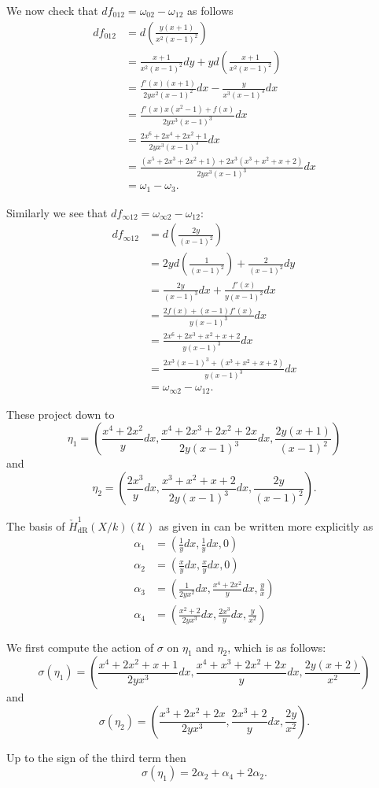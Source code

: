 \documentclass[draft, 11pt]{article} %
\theoremstyle{plain}
\theoremstyle{remark}
\newcommand{\cU}{{\mathcal U}}
\newcommand{\cechderhamhone}{\check{H}_{\text {dR}}^1(X/k)}
\begin{document}
We now check that $df_{0 1 2} = \omega_{0 2} - \omega_{1 2}$ as follows
\begin{align*}
df_{0 1 2} & = d\left(\frac{y(x+1)}{x^2(x-1)^2} \right) \\
& = \frac{x+1}{x^2(x-1)^2}dy + y d\left( \frac{x+1}{x^2(x-1)^2} \right) \\
& = \frac{f'(x)(x+1)}{2yx^2(x-1)^2} dx - \frac{y}{x^3(x-1)^3}dx \\
& = \frac{f'(x)x(x^2-1) + f(x)}{2yx^3(x-1)^3}dx \\
& = \frac{2x^6 + 2x^4 + 2x^2 +1}{2yx^3(x-1)^3} dx \\
& = \frac{(x^5 + 2x^3 + 2x^2 + 1) + 2x^3(x^3 + x^2 + x + 2)}{2yx^3(x-1)^3}dx \\
& = \omega_1 - \omega_3.
\end{align*}

Similarly we see that $df_{\infty 1 2} = \omega_{\infty 2} - \omega_{1 2}$:
\begin{align*}
df_{\infty 1 2} & = d \left( \frac{2y}{(x-1)^2} \right) \\
& = 2y d\left( \frac{1}{(x-1)^2} \right) + \frac{2}{(x-1)^2} dy \\
& = \frac{2y}{(x-1)^3}dx + \frac{f'(x)}{y(x-1)^2}dx \\
& = \frac{2f(x) + (x-1)f'(x)}{y(x-1)^3} dx \\
& = \frac{2x^6 + 2x^3 + x^2 + x + 2}{y(x-1)^3} dx \\
& = \frac{2x^3(x-1)^3 + (x^3 + x^2 + x + 2)}{y(x-1)^3}dx \\
& = \omega_{\infty 2} - \omega_{12}.
\end{align*}

These project down to 
\[
\eta_1 = \left( \frac{x^4 + 2x^2}{y}dx , \frac{x^4 + 2x^3 + 2x^2 + 2x}{2y(x-1)^3}dx, \frac{2y(x+1)}{(x-1)^2} \right)
\]
and
\[
\eta_2 = \left(\frac{2x^3}{y}dx, \frac{x^3+x^2+x+2}{2y(x-1)^3}dx, \frac{2y}{(x-1)^2} \right).
\]

The basis of $\cechderhamhone (\cU)$ as given in \cite{derhamactions} can be written more explicitly as 
\begin{align*}
\alpha_1 & = \left( \frac{1}{y}dx, \frac{1}{y}dx, 0 \right) \\
\alpha_2 & = \left( \frac{x}{y}dx, \frac{x}{y}dx, 0 \right) \\
\alpha_3 & = \left( \frac{1}{2yx^2}dx, \frac{x^4 + 2x^2}{y}dx, \frac{y}{x} \right) \\
\alpha_4 & = \left( \frac{x^2 + 2}{2yx^3}dx, \frac{2x^3}{y}dx, \frac{y}{x^2} \right)
\end{align*}

We first compute the action of $\sigma$ on $\eta_1$ and $\eta_2$, which is as follows:
\[
\sigma(\eta_1) = \left( \frac{x^4 + 2x^2 + x +1}{2yx^3}dx, \frac{x^4 + x^3 + 2x^2 + 2x}{y}dx, \frac{2y(x+2)}{x^2} \right) 
\]
and
\[
\sigma(\eta_2) = \left( \frac{x^3 + 2x^2 +2x}{2yx^3}, \frac{2x^3 + 2}{y}dx, \frac{2y}{x^2} \right).
\]

Up to the sign of the third term then 
\[
\sigma(\eta_1) = 2\alpha_2 + \alpha_4 + 2\alpha_2.
\]



\end{document}
